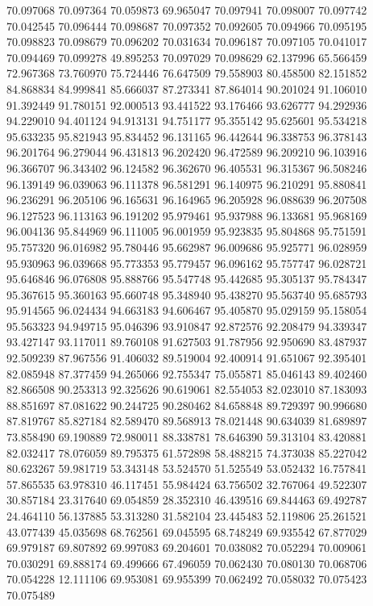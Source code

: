 70.097068
70.097364
70.059873
69.965047
70.097941
70.098007
70.097742
70.042545
70.096444
70.098687
70.097352
70.092605
70.094966
70.095195
70.098823
70.098679
70.096202
70.031634
70.096187
70.097105
70.041017
70.094469
70.099278
49.895253
70.097029
70.098629
62.137996
65.566459
72.967368
73.760970
75.724446
76.647509
79.558903
80.458500
82.151852
84.868834
84.999841
85.666037
87.273341
87.864014
90.201024
91.106010
91.392449
91.780151
92.000513
93.441522
93.176466
93.626777
94.292936
94.229010
94.401124
94.913131
94.751177
95.355142
95.625601
95.534218
95.633235
95.821943
95.834452
96.131165
96.442644
96.338753
96.378143
96.201764
96.279044
96.431813
96.202420
96.472589
96.209210
96.103916
96.366707
96.343402
96.124582
96.362670
96.405531
96.315367
96.508246
96.139149
96.039063
96.111378
96.581291
96.140975
96.210291
95.880841
96.236291
96.205106
96.165631
96.164965
96.205928
96.088639
96.207508
96.127523
96.113163
96.191202
95.979461
95.937988
96.133681
95.968169
96.004136
95.844969
96.111005
96.001959
95.923835
95.804868
95.751591
95.757320
96.016982
95.780446
95.662987
96.009686
95.925771
96.028959
95.930963
96.039668
95.773353
95.779457
96.096162
95.757747
96.028721
95.646846
96.076808
95.888766
95.547748
95.442685
95.305137
95.784347
95.367615
95.360163
95.660748
95.348940
95.438270
95.563740
95.685793
95.914565
96.024434
94.663183
94.606467
95.405870
95.029159
95.158054
95.563323
94.949715
95.046396
93.910847
92.872576
92.208479
94.339347
93.427147
93.117011
89.760108
91.627503
91.787956
92.950690
83.487937
92.509239
87.967556
91.406032
89.519004
92.400914
91.651067
92.395401
82.085948
87.377459
94.265066
92.755347
75.055871
85.046143
89.402460
82.866508
90.253313
92.325626
90.619061
82.554053
82.023010
87.183093
88.851697
87.081622
90.244725
90.280462
84.658848
89.729397
90.996680
87.819767
85.827184
82.589470
89.568913
78.021448
90.634039
81.689897
73.858490
69.190889
72.980011
88.338781
78.646390
59.313104
83.420881
82.032417
78.076059
89.795375
61.572898
58.488215
74.373038
85.227042
80.623267
59.981719
53.343148
53.524570
51.525549
53.052432
16.757841
57.865535
63.978310
46.117451
55.984424
63.756502
32.767064
49.522307
30.857184
23.317640
69.054859
28.352310
46.439516
69.844463
69.492787
24.464110
56.137885
53.313280
31.582104
23.445483
52.119806
25.261521
43.077439
45.035698
68.762561
69.045595
68.748249
69.935542
67.877029
69.979187
69.807892
69.997083
69.204601
70.038082
70.052294
70.009061
70.030291
69.888174
69.499666
67.496059
70.062430
70.080130
70.068706
70.054228
12.111106
69.953081
69.955399
70.062492
70.058032
70.075423
70.075489
